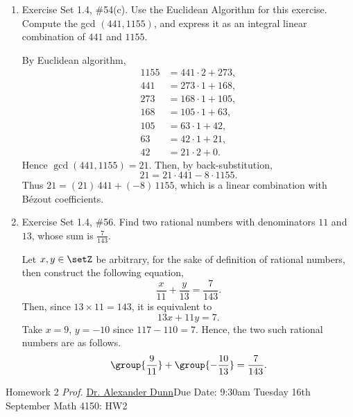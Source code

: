 \begin{enumerate}
  \item Exercise Set 1.4, \#54(c). Use the Euclidean Algorithm for this exercise. Compute the 
  gcd $(441,1155)$, and express it as an integral linear combination of $441$ and $1155$.
  \begin{subanswer}
    By Euclidean algorithm,
    \[
      \begin{aligned}
        1155 &= 441\cdot 2 + 273,\\
        441 &= 273\cdot 1 + 168,\\
        273 &= 168\cdot 1 + 105,\\
        168 &= 105\cdot 1 + 63,\\
        105 &= 63\cdot 1 + 42,\\
        63  &= 42\cdot 1 + 21,\\
        42  &= 21\cdot 2 + 0.
      \end{aligned}
    \]
    Hence $\gcd(441,1155)=21$. Then, by back-substitution,
    \[
      21 = 21\cdot 441 - 8\cdot 1155.
    \]
    Thus $21 = (21)\,441 + (-8)\,1155$, which is a linear combination with Bézout coefficients.
  \end{subanswer}


  \item Exercise Set 1.4, \#56. Find two rational numbers with denominators $11$ and $13$, whose 
  sum is $\frac{7}{143}$.
  \begin{subanswer}
    Let $x,y\in\setZ$ be arbitrary, for the sake of definition of rational numbers, then construct 
    the following equation,
    $$\dfrac{x}{11}+\dfrac{y}{13}=\dfrac{7}{143}.$$
    Then, since $13\times11=143$, it is equivalent to 
    $$13x+11y=7.$$ 
    Take $x=9$, $y=-10$ since $117-110=7$. Hence, the two such rational numbers are as follows.
    \[
      \group{\frac{9}{11}}+\group{-\frac{10}{13}}=\frac{7}{143}.
    \]
  \end{subanswer}
\end{enumerate}



\newpage{}
{Homework 2}
{\textit{Prof.} \href{https://alexjdunn.weebly.com/}{Dr. Alexander Dunn}}{Due Date: 9:30am Tuesday 16th September}
{Math 4150: HW2}


\newpage





